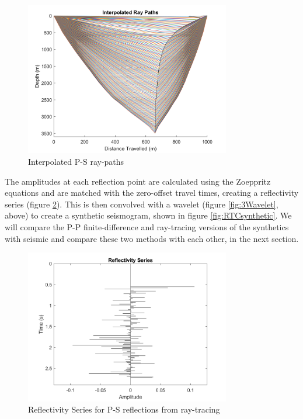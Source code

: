 \documentclass[12pt]{article}
\begin{document}
\begin{figure}[!htb]
	\centering
	\includegraphics[width=0.8\textwidth]{Figures/RTCinterp.png}
	\caption[Fox Creek ray-tracing ray-paths]{Interpolated P-S ray-paths }
	\label{fig:RTCinterp}
\end{figure}

	The amplitudes at each reflection point are calculated using the Zoeppritz equations and are matched with the zero-offset travel times, creating a reflectivity series (figure \ref{fig:RTCrefseries}). This is then convolved with a wavelet (figure \ref{fig:3Wavelet}, above) to create a synthetic seismogram, shown in figure \ref{fig:RTCsynthetic}. We will compare the P-P finite-difference and ray-tracing versions of the synthetics with seismic and compare these two methods with each other, in the next section.

\begin{figure}[!htb]
	\centering
	\includegraphics[width=0.8\textwidth]{Figures/RTCrefseries.png}
	\caption[Fox Creek ray-tracing P-S reflectivity series]{Reflectivity Series for P-S reflections from ray-tracing}
	\label{fig:RTCrefseries}
\end{figure}	
\end{document}
